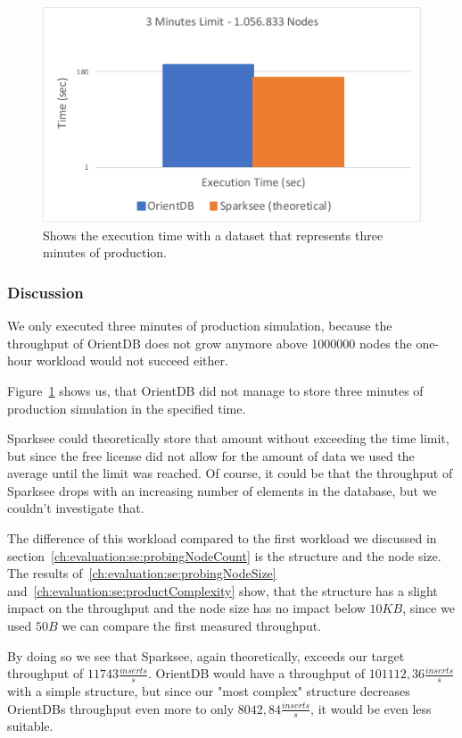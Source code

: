 \begin{figure}[h!]
  \centering
  \includegraphics[width=.75\textwidth]{images/production/singleSuitability}
  \caption{Shows the execution time with a dataset that represents three minutes of production.}
  \label{fig:singleSuitability}
\end{figure}

\subsubsection{Discussion}
\label{ch:evaluation:se:suitabilityDiscussion}
We only executed three minutes of production simulation,
because the throughput of OrientDB does not grow anymore above 1000000 nodes the one-hour workload would not succeed either.

Figure~\ref{fig:singleSuitability} shows us,
that OrientDB did not manage to store three minutes of production simulation in the specified time.

Sparksee could theoretically store that amount without exceeding the time limit,
but since the free license did not allow for the amount of data we used the average until the limit was reached.
Of course,
it could be that the throughput of Sparksee drops with an increasing number of elements in the database,
but we couldn't investigate that.

The difference of this workload compared to the first workload we discussed in section~\ref{ch:evaluation:se:probingNodeCount} is the structure and the node size.
The results of~\ref{ch:evaluation:se:probingNodeSize} and~\ref{ch:evaluation:se:productComplexity} show,
that the structure has a slight impact on the throughput and the node size has no impact below $ 10KB $,
since we used $ 50B $ we can compare the first measured throughput.

By doing so we see that Sparksee,
again theoretically,
exceeds our target throughput of $ 11743 \frac{inserts}{s} $.
OrientDB would have a throughput of $ 101112,36 \frac{inserts}{s} $ with a simple structure,
but since our "most complex" structure decreases OrientDBs throughput even more to only $ 8042,84 \frac{inserts}{s} $,
it would be even less suitable.

